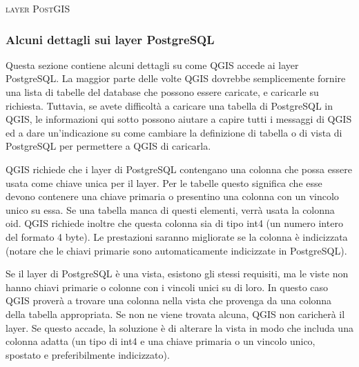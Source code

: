 \begin{Tip}\caption{\textsc{layer PostGIS}}
\end{Tip}

\subsubsection{Alcuni dettagli sui layer PostgreSQL}\label{sec:postgis_details}

Questa sezione contiene alcuni dettagli su come QGIS accede ai layer
PostgreSQL. La maggior parte delle volte QGIS dovrebbe semplicemente fornire
una lista di tabelle del database che possono essere caricate, e caricarle su
richiesta. Tuttavia, se avete difficoltà a caricare una tabella di PostgreSQL
in QGIS, le informazioni qui sotto possono aiutare a capire tutti i messaggi di QGIS ed a
dare un'indicazione su come cambiare la definizione di tabella o di vista di PostgreSQL per permettere
a QGIS di caricarla.

QGIS richiede che i layer di PostgreSQL contengano una colonna che possa essere usata come
chiave unica per il layer. Per le tabelle questo significa che esse devono
contenere una chiave primaria o presentino una colonna con un vincolo unico su
essa. Se una tabella manca di questi
elementi, verrà usata la colonna oid. QGIS richiede inoltre che questa colonna sia di
tipo int4 (un numero intero del formato 4 byte). Le prestazioni saranno migliorate se la colonna è
indicizzata (notare che le chiavi primarie sono automaticamente indicizzate in PostgreSQL).

Se il layer di PostgreSQL è una vista, esistono gli stessi requisiti, ma le
viste non hanno chiavi primarie o colonne con i vincoli unici su di loro. In
questo caso QGIS proverà a trovare una colonna nella vista che provenga da una
colonna della tabella appropriata. Se non ne viene trovata alcuna, QGIS non
caricherà il layer. Se questo accade, la soluzione è di alterare la vista in
modo che includa una colonna adatta (un tipo di int4 e una chiave primaria o un vincolo unico, spostato e preferibilmente indicizzato).

